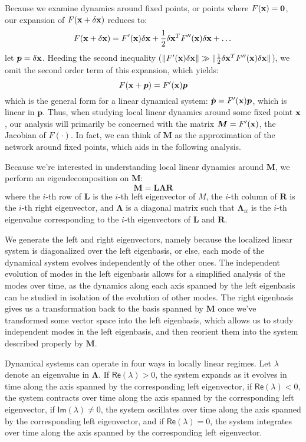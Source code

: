 \documentclass[12pt,a4paper,final]{iopart}
\begin{document}
Because we examine dynamics around fixed points, or points where $F({\bf x}) = {\bf 0}$, our expansion of $F({\bf x} + \delta {\bf x})$ reduces to:
\[
    F({\bf x} + \delta {\bf x}) = F'({\bf x})\delta {\bf x} + \frac{1}{2} \delta {\bf x}^T F''({\bf x}) \delta {\bf x} + \dots
\]
let $\boldsymbol{p} = \delta {\bf x}$. Heeding the second inequality ($\lVert F'({\bf x})\delta {\bf x} \rVert \gg \lVert \frac{1}{2} \delta {\bf x}^T F''({\bf x}) \delta {\bf x} \rVert$), we omit the second order term of this expansion, which yields:
\[
    F({\bf x} + \boldsymbol{p}) = F'({\bf x})\boldsymbol{p} 
\]
which is the general form for a linear dynamical system: $\dot{\boldsymbol{p}} = F'({\bf x})\boldsymbol{p}$, which is linear in $\boldsymbol{p}$. Thus, when studying local linear dynamics around some fixed point ${\bf x}$, our analysis will primarily be concerned with the matrix $\boldsymbol{M} = F'({\bf x})$, the Jacobian of $F(\cdot)$. In fact, we can think of $\boldsymbol{M}$ as the approximation of the network around fixed points, which aids in the following analysis.

Because we're interested in understanding local linear dynamics around $\boldsymbol{M}$, we perform an eigendecomposition on $\boldsymbol{M}$:
\[
    \boldsymbol{M} = \boldsymbol{L} \boldsymbol{\Lambda} \boldsymbol{R}
\]
where the $i$-th row of $\boldsymbol{L}$ is the $i$-th left eigenvector of $M$, the $i$-th column of $\boldsymbol{R}$ is the $i$-th right eigenvector, and $\boldsymbol{\Lambda}$ is a diagonal matrix such that $\boldsymbol{\Lambda}_{ii}$ is the $i$-th eigenvalue corresponding to the $i$-th eigenvectors of $\boldsymbol{L}$ and $\boldsymbol{R}$.

We generate the left and right eigenvectors, namely because the localized linear system is diagonalized over the left eigenbasis, or else, each mode of the dynamical system evolves independently of the other ones. The independent evolution of modes in the left eigenbasis allows for a simplified analysis of the modes over time, as the dynamics along each axis spanned by the left eigenbasis can be studied in isolation of the evolution of other modes. The right eigenbasis gives us a transformation back to the basis spanned by $\boldsymbol{M}$ once we've transformed some vector space into the left eigenbasis, which allows us to study independent modes in the left eigenbasis, and then reorient them into the system described properly by $\boldsymbol{M}$.

Dynamical systems can operate in four ways in locally linear regimes. Let $\lambda$ denote an eigenvalue in $\boldsymbol{\Lambda}$. If $\mathsf{Re}(\lambda) > 0$, the system expands as it evolves in time along the axis spanned by the corresponding left eigenvector, if $\mathsf{Re}(\lambda) < 0$, the system contracts over time along the axis spanned by the corresponding left eigenvector, if $\mathsf{Im}(\lambda) \neq 0$, the system oscillates over time along the axis spanned by the corresponding left eigenvector, and if $\mathsf{Re}(\lambda) = 0$, the system integrates over time along the axis spanned by the corresponding left eigenvector. 
\end{document}
